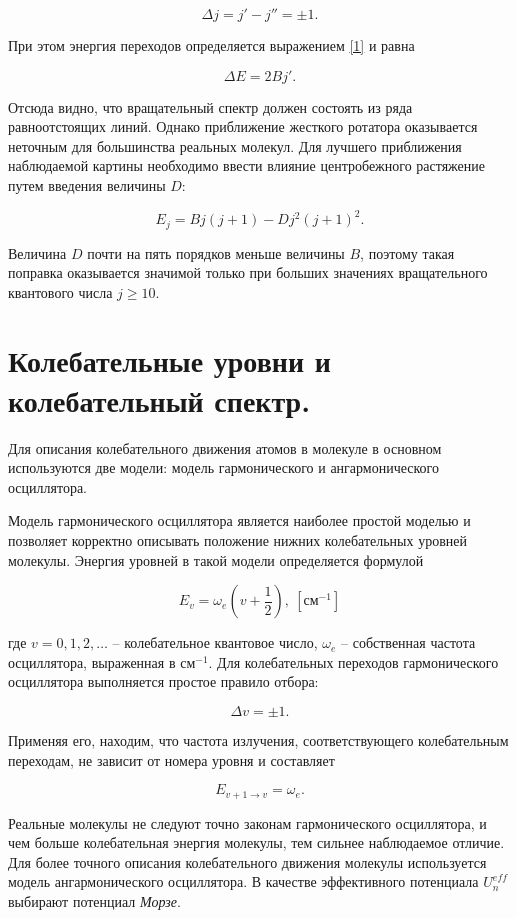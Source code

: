 \documentclass[11.5pt,a4paper,russian]{article}
\begin{document}
\[\Delta j = j' - j'' = \pm 1.\]

При этом энергия переходов определяется выражением \eqref{1} и равна

\[\Delta E = 2Bj'.\]

Отсюда видно, что вращательный спектр должен состоять из ряда равноотстоящих линий. Однако приближение жесткого ротатора оказывается неточным для большинства реальных молекул. Для лучшего приближения наблюдаемой картины необходимо ввести влияние центробежного растяжение путем введения величины $D$:

\[E_j = Bj(j+1) - Dj^2(j+1)^2.\]

Величина $D$ почти на пять порядков меньше величины $B$, поэтому такая поправка оказывается значимой только при больших значениях вращательного квантового числа $j \geq 10$.

\section{Колебательные уровни и колебательный спектр.}
Для описания колебательного движения атомов в молекуле в основном используются две модели: модель гармонического и ангармонического осциллятора.

Модель гармонического осциллятора является наиболее простой моделью и позволяет корректно описывать положение нижних колебательных уровней молекулы. Энергия уровней в такой модели определяется формулой

\[E_v = \omega_e\left(v + \dfrac{1}{2} \right), ~\left[ \text{см}^{-1} \right]\]

где $v = 0, 1, 2, \dots$ -- колебательное квантовое число, $\omega_e$ -- собственная частота осциллятора, выраженная в $\text{см}^{-1}$. Для колебательных переходов гармонического осциллятора выполняется простое правило отбора:

\[\Delta v = \pm 1.\]

Применяя его, находим, что частота излучения, соответствующего колебательным переходам, не зависит от номера уровня и составляет

\[E_{v+1 \rightarrow v} = \omega_e.\]

Реальные молекулы не следуют точно законам гармонического осциллятора, и чем больше колебательная энергия молекулы, тем сильнее наблюдаемое отличие. Для более точного описания колебательного движения молекулы используется модель ангармонического осциллятора. В качестве эффективного потенциала $U_n^{e f f}$ выбирают потенциал \textit{Морзе}.
\end{document}
